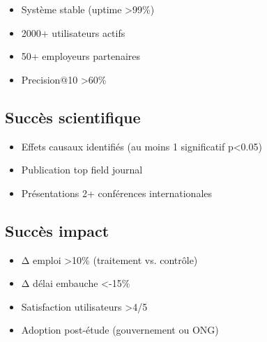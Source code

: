 \documentclass[12pt]{article}
\begin{document}
\begin{itemize}
    \item Système stable (uptime >99\%)
    \item 2000+ utilisateurs actifs
    \item 50+ employeurs partenaires
    \item Precision@10 >60\%
\end{itemize}

\subsection{Succès scientifique}

\begin{itemize}
    \item Effets causaux identifiés (au moins 1 significatif p<0.05)
    \item Publication top field journal
    \item Présentations 2+ conférences internationales
\end{itemize}

\subsection{Succès impact}

\begin{itemize}
    \item Δ emploi >10\% (traitement vs. contrôle)
    \item Δ délai embauche <-15\%
    \item Satisfaction utilisateurs >4/5
    \item Adoption post-étude (gouvernement ou ONG)
\end{itemize}
\end{document}
